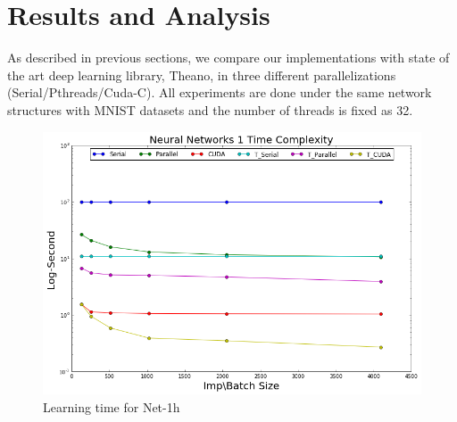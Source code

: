 \section{Results and Analysis}
\label{Results}


As described in previous sections, we compare our implementations with state of the art deep learning library, Theano, in three different parallelizations (Serial/Pthreads/Cuda-C). All experiments are done under the same network structures with MNIST datasets and the number of threads is fixed as 32.

\begin{figure}[ht]
\begin{center}
\centerline{\includegraphics[width=\columnwidth]{../../slide/nn1_time.png}}
\caption{Learning time for Net-1h}
\label{fig:nn1_time}
\end{center}
\vskip -0.4in
\end{figure}

